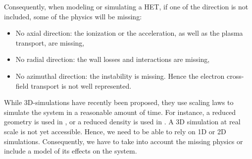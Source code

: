 Consequently, when modeling or simulating a \ac{HET}, if one of the direction is not included, some of the physics will be missing\string:
\begin{itemize}
  \item No axial direction\string: the ionization or the acceleration, as well as the plasma transport, are missing,
  \item No radial direction\string: the wall losses and interactions are missing,
  \item No azimuthal direction\string: the instability is missing. Hence the electron cross-field transport is not well represented.
\end{itemize}

While \acs{3D}-simulations have recently been proposed, they use scaling laws to simulate the system in a reasonable amount of time\citep{taccogna2019a}.
For instance, a reduced geometry is used in \citet{taccogna2018}, or a reduced density is used in \citet{fubiani2018a}.
A \acs{3D} simulation at real scale is not yet accessible.
Hence, we need to be able to rely on \acs{1D} or \acs{2D} simulations.
Consequently, we have to take into account the missing physics or include a model of its effects on the system.
